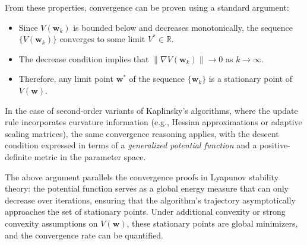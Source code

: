 \documentclass[12pt]{article}
\begin{document}
From these properties, convergence can be proven using a standard argument:
\begin{itemize}
    \item Since $V(\mathbf{w}_k)$ is bounded below and decreases monotonically, the sequence $\{V(\mathbf{w}_k)\}$ converges to some limit $V^* \in \mathbb{R}$.
    \item The decrease condition implies that $\|\nabla V(\mathbf{w}_k)\| \to 0$ as $k \to \infty$.
    \item Therefore, any limit point $\mathbf{w}^*$ of the sequence $\{\mathbf{w}_k\}$ is a stationary point of $V(\mathbf{w})$.
\end{itemize}

In the case of second-order variants of Kaplinsky's algorithms, where the update rule incorporates curvature information (e.g., Hessian approximations or adaptive scaling matrices), the same convergence reasoning applies, with the descent condition expressed in terms of a \emph{generalized potential function} and a positive-definite metric in the parameter space.

The above argument parallels the convergence proofs in Lyapunov stability theory: the potential function serves as a global energy measure that can only decrease over iterations, ensuring that the algorithm's trajectory asymptotically approaches the set of stationary points. Under additional convexity or strong convexity assumptions on $V(\mathbf{w})$, these stationary points are global minimizers, and the convergence rate can be quantified.
 
\end{document}
